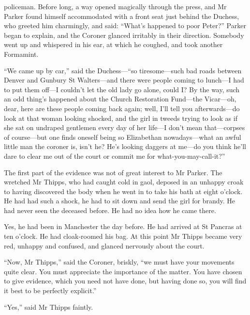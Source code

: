 policeman. Before long, a way opened magically through the press, and Mr Parker found himself accommodated with a front seat just behind the Duchess, who greeted him charmingly, and said: \enquote{What’s happened to poor Peter?} Parker began to explain, and the Coroner glanced irritably in their direction. Somebody went up and whispered in his ear, at which he coughed, and took another Formamint.

\enquote{We came up by car,} said the Duchess---\enquote{so tiresome\allowbreak---\allowbreak such bad roads between Denver and Gunbury St Walters\allowbreak---\allowbreak and there were people coming to lunch\allowbreak---\allowbreak I had to put them off\allowbreak---\allowbreak I couldn’t let the old lady go alone, could I? By the way, such an odd thing’s happened about the Church Restoration Fund\allowbreak---\allowbreak the Vicar\allowbreak---\allowbreak oh, dear, here are these people coming back again; well, I’ll tell you afterwards\allowbreak---\allowbreak do look at that woman looking shocked, and the girl in tweeds trying to look as if she sat on undraped gentlemen every day of her life\allowbreak---\allowbreak I don’t mean that\allowbreak---\allowbreak corpses of course\allowbreak---\allowbreak but one finds oneself being so Elizabethan nowadays\allowbreak---\allowbreak what an awful little man the coroner is, isn’t he? He’s looking daggers at me\allowbreak---\allowbreak do you think he’ll dare to clear me out of the court or commit me for what-you-may-call-it?}

The first part of the evidence was not of great interest to Mr Parker. The wretched Mr Thipps, who had caught cold in gaol, deposed in an unhappy croak to having discovered the body when he went in to take his bath at eight o’clock. He had had such a shock, he had to sit down and send the girl for brandy. He had never seen the deceased before. He had no idea how he came there.

Yes, he had been in Manchester the day before. He had arrived at St Pancras at ten o’clock. He had cloak-roomed his bag. At this point Mr Thipps became very red, unhappy and confused, and glanced nervously about the court.

\enquote{Now, Mr Thipps,} said the Coroner, briskly, \enquote{we must have your movements quite clear. You must appreciate the importance of the matter. You have chosen to give evidence, which you need not have done, but having done so, you will find it best to be perfectly explicit.}

\enquote{Yes,} said Mr Thipps faintly.

